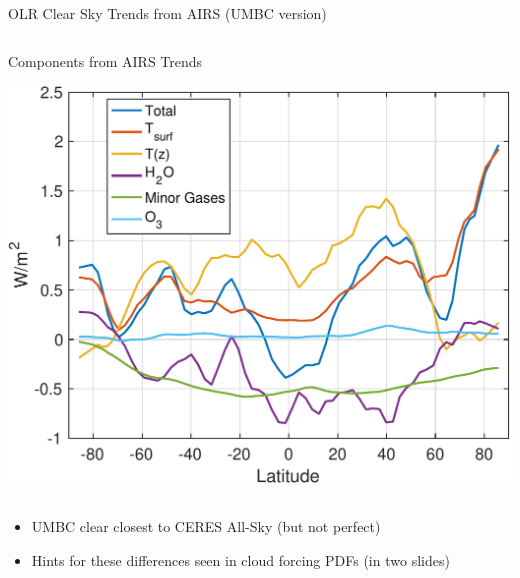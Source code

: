 \documentclass[10pt,t]{beamer}
\begin{document}
\begin{frame}{OLR Clear Sky Trends from AIRS (UMBC version)}
\begin{columns}
\begin{column}{0.5\columnwidth}
\begin{block}{\small Components from AIRS Trends}
\vspace{-0.1in}
\begin{center}
\includegraphics[width=\linewidth]{SunClimate2022/umbc_olr_components.pdf}
\end{center}
\end{block}
\end{column}
\end{columns}

\vspace{-0.05in}

\begin{itemize}
\item UMBC clear closest to CERES All-Sky (but not perfect)
\item Hints for these differences seen in cloud forcing PDFs (in two slides)
\end{itemize}
\end{frame}
\end{document}
